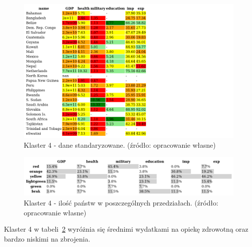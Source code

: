 \documentclass[11pt]{report}
\begin{document}
    \begin{figure}[!htp]
        \centering
        \includegraphics[width=1 \textwidth]{tables/CLUST/cluster4stdkmeans.png}
        \caption{Klaster 4 - dane standaryzowane. (źródło: opracowanie własne)}
        \label{tab:cl4std}
    \end{figure}

    \begin{figure}[!htp]
        \centering
        \includegraphics[width=1 \textwidth]{tables/CLUST/cluster4stdkmeanscount.png}
        \caption{Klaster 4 - ilość państw w poszczególnych przedziałach. (źródło: opracowanie własne)}
        \label{tab:cl4stdcount}
    \end{figure}

    Klaster 4 w tabeli~\ref{tab:cl4stdcount} wyróżnia się średnimi wydatkami na opiekę zdrowotną oraz bardzo niskimi na zbrojenia.
\end{document}
